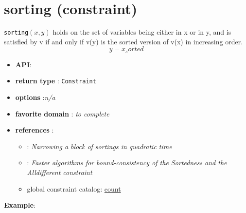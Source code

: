 \label{sorting}
\hypertarget{sorting}{}

\section{sorting (constraint)}\label{sorting:sortingconstraint}\hypertarget{sorting:sortingconstraint}{}
\begin{notedef}
  \texttt{sorting}$(x,y)$ holds on the set of variables being either in x or in y, and is satisfied by v if and only if v(y) is the sorted version of v(x) in increasing order.
$$y=x_sorted$$   
\end{notedef}

\begin{itemize}
	\item \textbf{API}: 
	\item \textbf{return type} : \texttt{Constraint}
	\item \textbf{options} :\emph{n/a}
	\item \textbf{favorite domain} : \emph{to complete}
	\item \textbf{references} :
	\begin{itemize}
      \item \cite{BleuzenCP97}: \emph{Narrowing a block of sortings in quadratic time}
      \item \cite{MehlhornCP00}: \emph{Faster algorithms for bound-consistency of the Sortedness and the Alldifferent constraint}
      \item global constraint catalog: \href{http://www.emn.fr/x-info/sdemasse/gccat/Csort.html}{count}
      \end{itemize}
\end{itemize}

\textbf{Example}:
